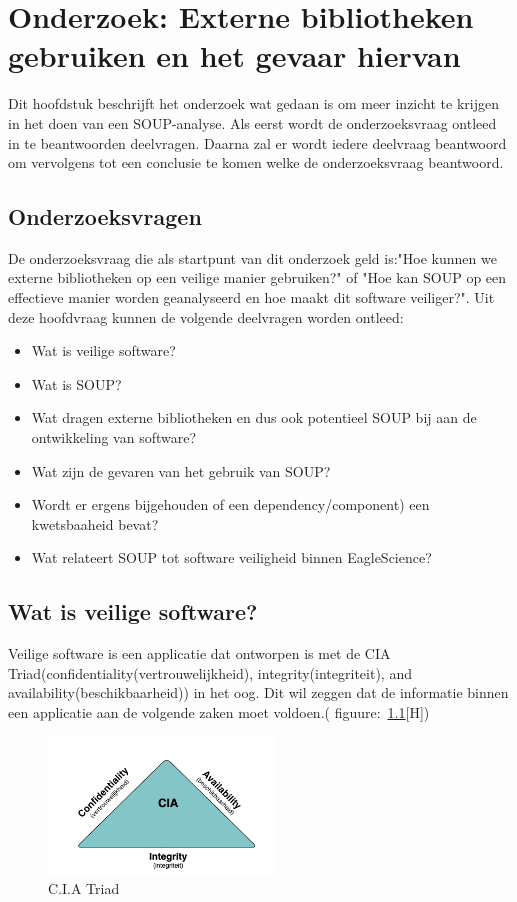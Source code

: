 \chapter{Onderzoek: Externe bibliotheken gebruiken en het gevaar hiervan}\label{ch:externeGevaren}
Dit hoofdstuk beschrijft het onderzoek wat gedaan is om meer inzicht te krijgen in het doen van een SOUP-analyse. Als eerst wordt de onderzoeksvraag ontleed in te beantwoorden deelvragen. Daarna zal er wordt iedere deelvraag beantwoord om vervolgens tot een conclusie te komen welke de onderzoeksvraag beantwoord.

\section{Onderzoeksvragen} \label{sec:SOUPOnderzoeksvragen}
De onderzoeksvraag die als startpunt van dit onderzoek geld is:"Hoe kunnen we externe bibliotheken op een veilige manier gebruiken?" of "Hoe kan SOUP op een effectieve manier worden geanalyseerd en hoe maakt dit software veiliger?". Uit deze hoofdvraag kunnen de volgende deelvragen worden ontleed:
\begin{itemize}
    \item Wat is veilige software?
    \item Wat is SOUP?
    \item Wat dragen externe bibliotheken en dus ook potentieel SOUP bij aan de ontwikkeling van software?
    \item Wat zijn de gevaren van het gebruik van SOUP?
    \item Wordt er ergens bijgehouden of een dependency/component) een kwetsbaaheid bevat?
    \item Wat relateert SOUP tot software veiligheid binnen EagleScience?
\end{itemize}


\section{Wat is veilige software?}
Veilige software is een applicatie dat ontworpen is met de CIA Triad(confidentiality(vertrouwelijkheid), integrity(integriteit), and availability(beschikbaarheid)) in het oog. Dit wil zeggen dat de informatie binnen een applicatie aan de volgende zaken moet voldoen.( figuure:~\ref{fig:CIA}[H])
\begin{figure}
    \centering
    \includegraphics[width=6cm]{gfx/CIA}
    \caption{C.I.A Triad}
    \label{fig:CIA}
\end{figure}

